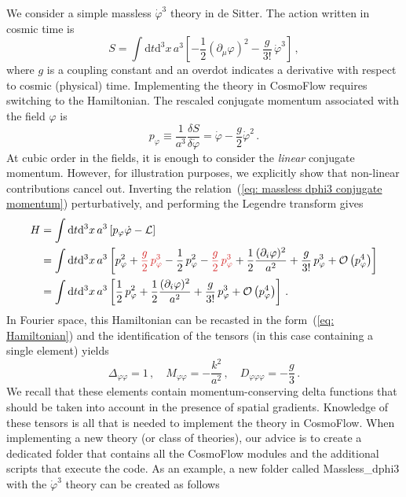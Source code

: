 \documentclass[11pt]{article}
\numberwithin{equation}{section} %
\def \d {\mathrm{d}}
\begin{document}
\vskip 4pt
We consider a simple massless $\dot{\varphi}^3$ theory in de Sitter. The action written in cosmic time is
\begin{equation}
\label{eq: dphi3 action}
    S = \int \d t\d^3x\, a^3\left[-\frac{1}{2}(\partial_\mu \varphi)^2 - \frac{g}{3!}\,\dot{\varphi}^3\right]\,,
\end{equation}
where $g$ is a coupling constant and an overdot indicates a derivative with respect to cosmic (physical) time. Implementing the theory in \textsf{CosmoFlow} requires switching to the Hamiltonian. The rescaled conjugate momentum associated with the field $\varphi$ is
\begin{equation}
\label{eq: massless dphi3 conjugate momentum}
    p_\varphi \equiv \frac{1}{a^3} \frac{\delta S}{\delta \dot{\varphi}} = \dot{\varphi} - \frac{g}{2}\dot{\varphi}^2\,.
\end{equation}
At cubic order in the fields, it is enough to consider the \textit{linear} conjugate momentum. However, for illustration purposes, we explicitly show that non-linear contributions cancel out. Inverting the relation~(\ref{eq: massless dphi3 conjugate momentum}) perturbatively, and performing the Legendre transform gives
\begin{equation}
    \begin{aligned}
    H &= \int \d t \d^3x \,a^3 \left[p_\varphi \dot{\varphi} - \mathcal{L}\right] \\
    &= \int \d t \d^3x \,a^3 \left[p_\varphi^2 + \textcolor{pyred}{\frac{g}{2}\,p_\varphi^3} - \frac{1}{2}\,p_\varphi^2 - \textcolor{pyred}{\frac{g}{2}\,p_\varphi^3} + \frac{1}{2}\frac{(\partial_i \varphi)^2}{a^2} + \frac{g}{3!}\,p_\varphi^3 + \mathcal{O}\left(p_\varphi^4\right) \right] \\
    &= \int \d t \d^3x \,a^3 \left[\frac{1}{2}\,p_\varphi^2 + \frac{1}{2}\frac{(\partial_i \varphi)^2}{a^2} + \frac{g}{3!}\,p_\varphi^3 + \mathcal{O}\left(p_\varphi^4\right) \right]\,.
    \end{aligned}
\end{equation}
In Fourier space, this Hamiltonian can be recasted in the form~(\ref{eq: Hamiltonian}) and the identification of the tensors (in this case containing a single element) yields
\begin{equation}
    \Delta_{\varphi\varphi} = 1 \,,\quad M_{\varphi\varphi} = -\frac{k^2}{a^2}\,,\quad D_{\varphi\varphi\varphi} = -\frac{g}{3}\,.
\end{equation}
We recall that these elements contain momentum-conserving delta functions that should be taken into account in the presence of spatial gradients. Knowledge of these tensors is all that is needed to implement the theory in \textsf{CosmoFlow}. When implementing a new theory (or class of theories), our advice is to create a dedicated folder that contains all the \textsf{CosmoFlow} modules and the additional scripts that execute the code. As an example, a new folder called \textsf{Massless\_dphi3} with the $\dot{\varphi}^3$ theory can be created as follows
\end{document}
